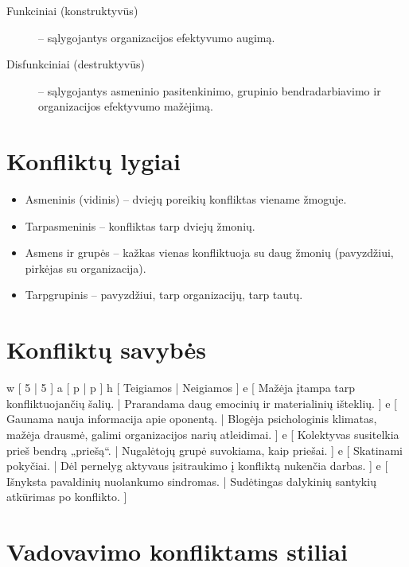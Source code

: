 \begin{description}
  \item[Funkciniai (konstruktyvūs)] – sąlygojantys organizacijos efektyvumo
    augimą.
  \item[Disfunkciniai (destruktyvūs)] – sąlygojantys asmeninio
    pasitenkinimo, grupinio bendradarbiavimo ir organizacijos efektyvumo
    mažėjimą.
\end{description}

\section{Konfliktų lygiai}

\begin{itemize}
  \item Asmeninis (vidinis) – dviejų poreikių konfliktas viename žmoguje.
  \item Tarpasmeninis – konfliktas tarp dviejų žmonių.
  \item Asmens ir grupės – kažkas vienas konfliktuoja su daug žmonių
    (pavyzdžiui, pirkėjas su organizacija).
  \item Tarpgrupinis – pavyzdžiui, tarp organizacijų, tarp tautų.
\end{itemize}

\section{Konfliktų savybės}

\xtable
{
  w [ 5 | 5 ]
  a [ p | p ]
  h [ Teigiamos | Neigiamos ]
  e [ Mažėja įtampa tarp konfliktuojančių šalių.
    | Prarandama daug emocinių ir materialinių išteklių. ]
  e [ Gaunama nauja informacija apie oponentą.
    | Blogėja psichologinis klimatas, mažėja drausmė, galimi
      organizacijos narių atleidimai. ]
  e [ Kolektyvas susitelkia prieš bendrą „priešą“.
    | Nugalėtojų grupė suvokiama, kaip priešai. ]
  e [ Skatinami pokyčiai.
    | Dėl pernelyg aktyvaus įsitraukimo į konfliktą nukenčia darbas. ]
  e [ Išnyksta pavaldinių nuolankumo sindromas.
    | Sudėtingas dalykinių santykių atkūrimas po konflikto. ]
}

\section{Vadovavimo konfliktams stiliai}

